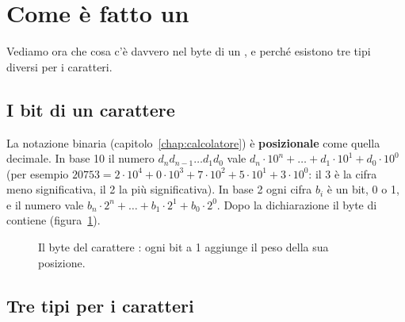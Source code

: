 \section{Come è fatto un }

Vediamo ora che cosa c'è davvero nel byte di un , e perché
esistono tre tipi diversi per i caratteri.

\subsection{I bit di un carattere}

La notazione binaria (capitolo~\ref{chap:calcolatore}) è
\textbf{posizionale} come quella decimale. In base 10 il numero
$d_n d_{n-1} \dots d_1 d_0$ vale
$d_n \cdot 10^n + \dots + d_1 \cdot 10^1 + d_0 \cdot 10^0$ (per esempio
$20753 = 2 \cdot 10^4 + 0 \cdot 10^3 + 7 \cdot 10^2 + 5 \cdot 10^1 + 3 \cdot
10^0$: il 3 è la cifra meno significativa, il 2 la più significativa). In
base 2 ogni cifra $b_i$ è un bit, 0 o 1, e il numero vale
$b_n \cdot 2^n + \dots + b_1 \cdot 2^1 + b_0 \cdot 2^0$. Dopo la
dichiarazione  il byte di  contiene
 (figura~\ref{fig:bit-a}).

\begin{figure}[H]
  \centering
  \caption{Il byte del carattere : ogni bit a 1 aggiunge il peso
           della sua posizione.}
  \label{fig:bit-a}
\end{figure}

\subsection{Tre tipi per i caratteri}

